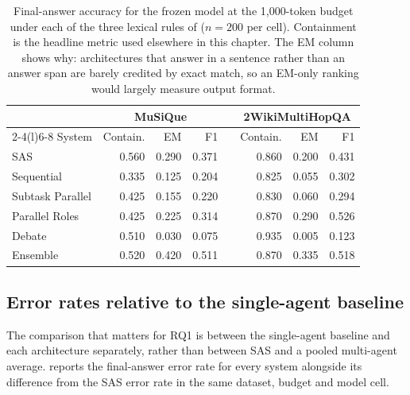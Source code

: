 \begin{table}[htbp]
  \centering
  \small
  \caption[Sensitivity of the benchmark to the lexical rule]{Final-answer accuracy for the frozen
  model at the 1,000-token budget under each of the three lexical rules of 
  ($n=200$ per cell). Containment is the headline metric used elsewhere in this chapter. The EM
  column shows why: architectures that answer in a sentence rather than an answer span are barely
  credited by exact match, so an EM-only ranking would largely measure output format.}
  \label{tab:metric-sensitivity}
  \begin{tabular}{@{}lrrrcrrr@{}}
    \toprule
    & \multicolumn{3}{c}{MuSiQue} & & \multicolumn{3}{c}{2WikiMultiHopQA} \\
    \cmidrule(r){2-4}\cmidrule(l){6-8}
    System & Contain. & EM & F1 & & Contain. & EM & F1 \\
    \midrule
    SAS & 0.560 & 0.290 & 0.371 & & 0.860 & 0.200 & 0.431 \\
    Sequential & 0.335 & 0.125 & 0.204 & & 0.825 & 0.055 & 0.302 \\
    Subtask Parallel & 0.425 & 0.155 & 0.220 & & 0.830 & 0.060 & 0.294 \\
    Parallel Roles & 0.425 & 0.225 & 0.314 & & 0.870 & 0.290 & 0.526 \\
    Debate & 0.510 & 0.030 & 0.075 & & 0.935 & 0.005 & 0.123 \\
    Ensemble & 0.520 & 0.420 & 0.511 & & 0.870 & 0.335 & 0.518 \\
    \bottomrule
  \end{tabular}
\end{table}

\subsection{Error rates relative to the single-agent baseline}

The comparison that matters for RQ1 is between the single-agent baseline and each architecture separately, rather than between SAS and a pooled multi-agent average.  reports the final-answer error rate for every system alongside its difference from the SAS error rate in the same dataset, budget and model cell.

